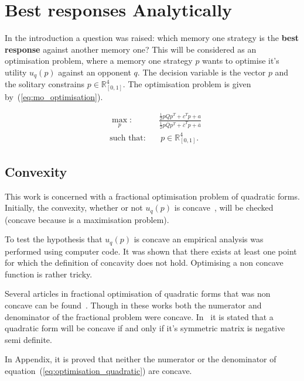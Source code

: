 \documentclass[10pt]{article}
\newcommand{\R}{\mathbb{R}}
\begin{document}
\section{Best responses Analytically}

In the introduction a question was raised: which memory one strategy is the \textbf{best response}
against another memory one? This will be considered as an optimisation problem,
where a memory one strategy \(p\) wants to optimise it's utility \(u_q(p)\)
against an opponent \(q\). The decision variable is the vector \(p\) and the 
solitary constrains \(p \in \R^4_{[0, 1]} \). The optimisation problem is 
given by~(\ref{eq:mo_optimisation}).

\begin{equation}\label{eq:mo_optimisation}
\begin{aligned}
& \max_p: && \frac{\frac{1}{2}  p  Q  p^T + c^T p + a} 
                  {\frac{1}{2}  p  \bar{Q}  p^T + \bar{c}^T  p + \bar{a}}
\\
& \text{such that}: && \ p \in \R^4_{[0, 1]}.
\end{aligned}
\end{equation}

\subsection{Convexity}

This work is concerned with a fractional optimisation problem of quadratic forms.
Initially, the convexity, whether or not \(u_{q}(p)\) is concave~\cite{Gradshteyn2007},
will be checked (concave because is a maximisation  problem).

To test the hypothesis that \(u_q(p)\) is concave an empirical analysis
was performed using computer code. %
It was shown that there exists at least one point for which the definition of
concavity does not hold. Optimising a non concave function is rather tricky.

Several articles in fractional optimisation of quadratic forms that was non concave
can be found~\cite{Beck2009, Hongyan2014}. Though in these works both the numerator
and denominator of the fractional problem were concave. In~\cite{Anton2014} it is
stated that a quadratic form will be concave if and only if it's symmetric matrix is
negative semi definite.

In Appendix, it is proved that neither the numerator or the denominator of
equation~(\ref{eq:optimisation_quadratic}) are concave.
\end{document}
